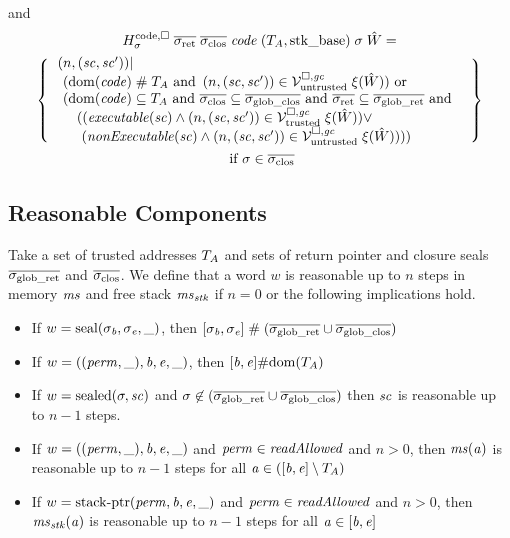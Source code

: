 \documentclass[a4paper]{article}
\begin{document}
and
\begin{multline*}
  H^\mathrm{code,\square}_\sigma \; \sigrets \; \sigcloss \; \code \;
  (\ta,\stkb) \; \sigma \; \hat{W}= \\
  \left\{
    \begin{array}{l}
\left. \npair{(\vsc, \vsc' )} \middle| \right. \\
      \begin{array}{l}
        (\dom(\code) \mathrel{\#} \ta \tand \npair{(\vsc,\vsc')} \in \lrv \; \xi(\hat{W})) \tor\\
        (\dom(\code) \subseteq \ta \tand \sigcloss \subseteq \gsigcloss \tand \sigrets \subseteq \gsigrets \tand \\
         \quad((\exec{\vsc} \wedge \npair{(\vsc,\vsc')} \in \lrvtrusted \; \xi(\hat{W})) \vee\\
         \quad\ (\nonExec{\vsc} \wedge\npair{(\vsc,\vsc')} \in \lrv \; \xi(\hat{W}))))
      \end{array}
    \end{array}
  \right\}\\
  \text{ if } \sigma \in \sigcloss
\end{multline*}

\subsection{Reasonable Components}
\label{sec:reasonability}

Take a set of trusted addresses $T_{A}$ and sets of return pointer and closure seals $\overline{\sigma_{\mathrm{glob\_ret}}}$ and $\sigcloss$.
We define that a word $w$ is reasonable up to $n$ steps in memory $\mathit{ms}$ and
free stack $\mathit{ms}_{\mathit{stk}}$ if $n=0$
or the following implications hold.
\begin{definition}
  \label{def:reasonable-word}
  \begin{itemize}
  \item If $w = \mathrm{seal}(\sigma_{\mathit{b}},\sigma_{\mathit{e}},\_)$, then
    $[\sigma_{\mathit{b}},\sigma_{\mathit{e}}] \mathrel{\#} (\overline{\sigma_{\mathrm{glob\_ret}}} \cup \overline{\sigma_{\mathrm{glob\_clos}}})$
  \item If $w = ((\mathit{perm},\_),\mathit{b},\mathit{e},\_)$, then $[\mathit{b},\mathit{e}] \# \mathrm{dom}(T_{A})$
  \item If $w = \mathrm{sealed}(\sigma,\mathit{sc})$ and $\sigma \not\in (\overline{\sigma_{\mathrm{glob\_ret}}}\cup
    \overline{\sigma_{\mathrm{glob\_clos}}})$ then $\mathit{sc}$ is reasonable up to $n - 1$ steps.
  \item If $w = ((\mathit{perm},\_),\mathit{b},\mathit{e},\_)$ and $\perm \in \readAllowed{}$
    and $n > 0$, then $\mathit{ms}(\mathit{a})$ is reasonable up to $n - 1$ steps for all
    $\mathit{a} \in ([\mathit{b},\mathit{e}] \setminus T_{A})$
  \item If $w = \mathrm{stack\text{-}ptr}(\mathit{perm},\mathit{b},\mathit{e},\_)$ and $\perm \in \readAllowed{}$
    and $n > 0$, then $\mathit{ms}_{\mathit{stk}}(\mathit{a})$ is reasonable up to $n - 1$ steps for
    all $\mathit{a} \in [\mathit{b},\mathit{e}]$
  \end{itemize}
\end{definition}
\end{document}
